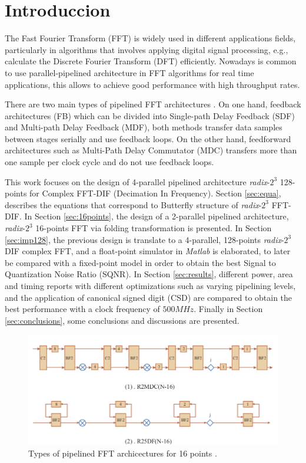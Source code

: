 \documentclass[journal,comsoc]{IEEEtran}
\begin{document}
\section{Introduccion}

The Fast Fourier Transform (FFT) is widely used in different applications fields, particularly in algorithms that involves applying digital signal processing, e.g., calculate the Discrete Fourier Transform (DFT) efficiently. Nowadays is common to use parallel-pipelined architecture in FFT algorithms for real time applications, this allows to achieve good performance with high throughput rates.

There are two main types of pipelined FFT architectures  \cite{shousheng_he_designing_1998}. On one hand, feedback architectures (FB) which can be divided into Single-path Delay Feedback (SDF) and Multi-path Delay Feedback (MDF), both methods transfer data samples between stages serially and use feedback loops. On the other hand, feedforward architectures such as Multi-Path Delay Commutator (MDC) transfers more than one sample per clock cycle and do not use feedback loops.

This work focuses on the design of 4-parallel pipelined architecture \textit{radix}-$2^3$ 128-points for Complex FFT-DIF (Decimation In Frequency). Section \ref{sec:equa}, describes the equations that correspond to Butterfly structure of \textit{radix}-$2^3$ FFT-DIF. In Section \ref{sec:16points}, the design of a 2-parallel pipelined architecture, \textit{radix}-$2^3$ 16-points FFT via folding transformation is presented. In Section \ref{sec:imp128}, the previous design is translate to a 4-parallel, 128-points \textit{radix}-$2^3$ DIF complex FFT, and a float-point simulator in \textit{Matlab} is elaborated, to later be compared with a fixed-point model in order to obtain the best Signal to Quantization Noise Ratio (SQNR).
In Section \ref{sec:results}, different power, area and timing reports with different optimizations such as varying pipelining levels, and the application of canonical signed digit (CSD) are compared to obtain the best performance with a clock frequency of $500MHz$. Finally in Section \ref{sec:conclusions}, some conclusions and discussions are presented.  


\begin{figure} 
	\centering
	\includegraphics[width=0.5\linewidth]{Diagramas/types_FFT.png}
	\caption{Types of pipelined FFT archicectures for 16 points \cite{type_FFT_MIT}.}
	\label{fig:types_fft}
\end{figure}
\end{document}
